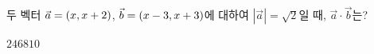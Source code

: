 두 벡터 $\vec{a}=(x{,}\mkern3mu\mathopen{}x+2)$, $\vec{b}=(x-3{,}\mkern3mu\mathopen{}x+3)$에 대하여 $|\vec{a}|=\sqrt{2}$일 때, $\vec{a}\cdot\vec{b}$는?
\begin{choices32}{$2$}{$4$}{$6$}{$8$}{$10$}\end{choices32}
